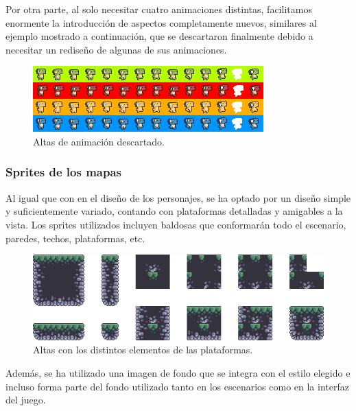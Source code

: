 \documentclass[12pt, spanish]{article}
\begin{document}
Por otra parte, al solo necesitar cuatro animaciones distintas, facilitamos enormente la introducción de aspectos completamente nuevos, similares al ejemplo mostrado a continuación, que se descartaron finalmente debido a necesitar un rediseño de algunas de sus animaciones.

\begin{figure}[H]
	\centering
	\includegraphics[width=\textwidth]{"multimedia/dinos.png"}
	\caption{Altas de animación descartado.}\label{figure:dinos}
\end{figure}


\subsubsection{Sprites de los mapas}

Al igual que con en el diseño de los personajes, se ha optado por un diseño simple y suficientemente variado, contando con plataformas detalladas y amigables a la vista. Los sprites utilizados incluyen baldosas que conformarán todo el escenario, paredes, techos, plataformas, etc.

\begin{figure}[H]
	\centering
	\includegraphics[width=\textwidth]{"multimedia/terrain.png"}
	\caption{Altas con los distintos elementos de las plataformas.}\label{figure:terrain}
\end{figure}

Además, se ha utilizado una imagen de fondo que se integra con el estilo elegido e incluso forma parte del fondo utilizado tanto en los escenarios como en la interfaz del juego.
\end{document}
